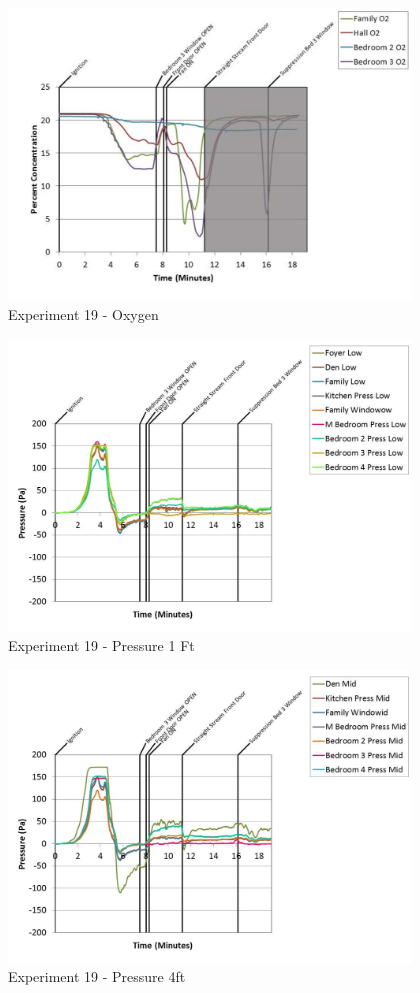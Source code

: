 \documentclass{article}
\begin{document}
\begin{appendices}
	\clearpage

	\begin{figure}[h!]
		\centering
		\includegraphics[height=3.05in]{0_Images/Results_Charts/Exp_19_Charts/Oxygen.pdf}
		\caption{Experiment 19 - Oxygen}
	\end{figure}
 

	\begin{figure}[h!]
		\centering
		\includegraphics[height=3.05in]{0_Images/Results_Charts/Exp_19_Charts/Pressure1Ft.pdf}
		\caption{Experiment 19 - Pressure 1 Ft}
	\end{figure}
 
	\clearpage

	\begin{figure}[h!]
		\centering
		\includegraphics[height=3.05in]{0_Images/Results_Charts/Exp_19_Charts/Pressure4ft.pdf}
		\caption{Experiment 19 - Pressure 4ft}
	\end{figure}
 


\end{appendices}
\end{document}
